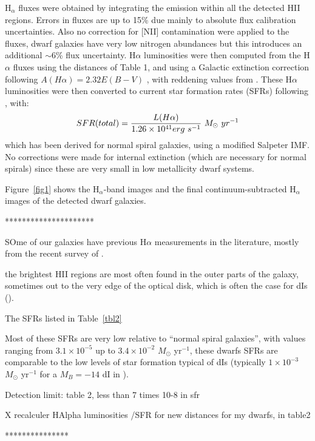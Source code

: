 \documentclass[12pt,preprint]{aastex}
\begin{document}
H$_\alpha$ fluxes were obtained by 
integrating the emission within all the detected HII regions. Errors in fluxes are up to 15\% due mainly to absolute flux calibration uncertainties. 
Also no correction for [NII] contamination were applied to the fluxes, dwarf galaxies have very low nitrogen abundances
\citep[see, e.g.,][]{scm03b} but this introduces an additional $\sim $6\% flux uncertainty.
H$\alpha$ luminosities were then computed from the H$\alpha$ fluxes using the distances of Table 1, and using a Galactic extinction correction following 
$A(H\alpha ) = 2.32 E(B-V)$ \citep{mh94}, with reddening values from \citet{sfd98}.
These H$\alpha$ luminosities were then converted to current star formation rates (SFRs) following  \citet{ktc94},  with:
\begin{equation}
SFR(total) = {{L(H\alpha )}\over{1.26\times 10^{41} erg\  s^{-1}}}\
 M_\odot\  yr^{-1}
\end{equation}
which has been derived for normal spiral galaxies, using a modified Salpeter IMF.  
No corrections were made for internal extinction (which are necessary for normal spirals)
since these are very small in low metallicity dwarf systems.


 Figure~\ref{fig1} shows the H$_\alpha$-band images and the final continuum-subtracted
H$_\alpha$ images of the detected dwarf galaxies. 


*********************
 

SOme of our galaxies have previous H$\alpha$ measurements in the literature, mostly from the recent survey of \citet{kl08}. 

the brightest HII regions are most often found in the outer parts of
the galaxy, sometimes out to the very edge of the optical disk, which is often
the case for dIs (\citet{bha98}). 

The SFRs listed in Table~\ref{tbl2} 

Most of these SFRs are very low relative to ``normal spiral galaxies'', with values
ranging from $3.1\times 10^{-5}$ up to $3.4\times 10^{-2}$ $M_{\odot}$ yr$^{-1}$, 
  these dwarfs SFRs 
are comparable
to the low levels of star formation typical of dIs (typically $1\times 10^{-3}$ 
$M_{\odot}$ yr$^{-1}$ for a $M_B=-14$ dI in \citep{kk07}). 

Detection limit: table 2, less than 7 times 10-8 in sfr 

X recalculer HAlpha luminosities /SFR for new distances for my dwarfs, in table2


***************
\end{document}
